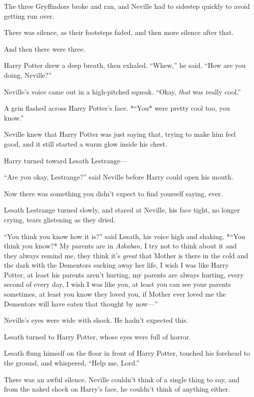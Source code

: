 The three Gryffindors broke and ran, and Neville had to sidestep quickly
to avoid getting run over.

There was silence, as their footsteps faded, and then more silence after
that.

And then there were three.

Harry Potter drew a deep breath, then exhaled. ``Whew,'' he said. ``How
are you doing, Neville?''

Neville's voice came out in a high-pitched squeak. ``Okay, \emph{that}
was really cool.''

A grin flashed across Harry Potter's face. *``You* were pretty cool too,
you know.''

Neville knew that Harry Potter was just saying that, trying to make him
feel good, and it still started a warm glow inside his chest.

Harry turned toward Lesath Lestrange---

``Are you okay, Lestrange?'' said Neville before Harry could open his
mouth.

Now there was something you didn't expect to find yourself saying, ever.

Lesath Lestrange turned slowly, and stared at Neville, his face tight,
no longer crying, tears glistening as they dried.

``You think you know how it is?'' said Lesath, his voice high and
shaking. *``You think you know?* My parents are in \emph{Azkaban,} I try
not to think about it and they always remind me, they think it's
\emph{great} that Mother is there in the cold and the dark with the
Dementors sucking away her life, I wish I was like Harry Potter, at
least his parents aren't hurting, my parents are always hurting, every
second of every day, I wish I was like you, at least you can see your
parents sometimes, at least you know they loved you, if Mother ever
loved me the Dementors will have eaten that thought by now---''

Neville's eyes were wide with shock. He hadn't expected this.

Lesath turned to Harry Potter, whose eyes were full of horror.

Lesath flung himself on the floor in front of Harry Potter, touched his
forehead to the ground, and whispered, ``Help me, Lord.''

There was an awful silence. Neville couldn't think of a single thing to
say, and from the naked shock on Harry's face, he couldn't think of
anything either.

